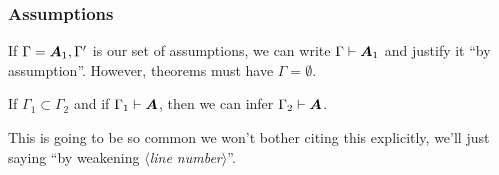 \subsubsection{Assumptions}
If $\Gamma=\boldsymbol{A}_{1},\Gamma'$ is our set of assumptions, we
can write $\Gamma\vdash\boldsymbol{A}_{1}$ and justify it ``by assumption''.
However, theorems must have $\Gamma=\emptyset$.

\begin{theorem}[Weakening]%
If $\Gamma_{1}\subset\Gamma_{2}$ and if $\Gamma_{1}\vdash\boldsymbol{A}$,
then we can infer $\Gamma_{2}\vdash\boldsymbol{A}$.
\end{theorem}
This is going to be so common we won't bother citing this explicitly,
we'll just saying ``by weakening $\langle$\textit{line number\/}$\rangle$''.
